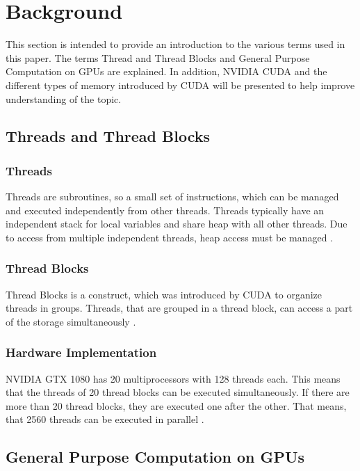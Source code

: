 \documentclass[conference]{IEEEtran}
\begin{document}
	

\section{Background}

	This section is intended to provide an introduction to the various terms used in this paper. The terms Thread and Thread Blocks and General Purpose Computation on GPUs are explained. In addition, NVIDIA CUDA and the different types of memory introduced by CUDA will be presented to help improve understanding of the topic.

	\subsection{Threads and Thread Blocks}
	
	\subsubsection{Threads}
	Threads are subroutines, so a small set of instructions, which can be managed and executed independently from other threads. Threads typically have an independent stack for local variables and share heap with all other threads. Due to access from multiple independent threads, heap access must be managed  \cite{lamport1979make}.
	
	
	\subsubsection{Thread Blocks}
	Thread Blocks is a construct, which was introduced by CUDA to organize threads in groups. Threads, that are grouped in a thread block, can access a part of the storage simultaneously \cite{nvidia_developer_documentation}.
	
	\subsubsection{Hardware Implementation}
	NVIDIA GTX 1080 has 20 multiprocessors with 128 threads each. This means that the threads of 20 thread blocks can be executed simultaneously. If there are more than 20 thread blocks, they are executed one after the other.
	That means, that 2560 threads can be executed in parallel \cite{nvidia_gtx_1080_whitepaper}.
	
	
	
	\subsection{General Purpose Computation on GPUs}
		
\end{document}
